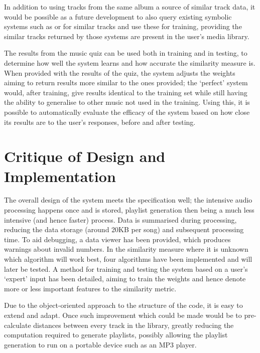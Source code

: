 In addition to using tracks from the same album a source of similar track data, it would be possible as a future development to also query existing symbolic systems such as  or  for similar tracks and use these for training, providing the similar tracks returned by those systems are present in the user's media library.

The results from the music quiz can be used both in training and in testing, to determine how well the system learns and how accurate the similarity measure is. When provided with the results of the quiz, the system adjusts the weights aiming to return results more similar to the ones provided; the `perfect' system would, after training, give results identical to the training set while still having the ability to generalise to other music not used in the training. Using this, it is possible to automatically evaluate the efficacy of the system based on how close its results are to the user's responses, before and after testing.
\section{Critique of Design and Implementation}
The overall design of the system meets the specification well; the intensive audio processing happens once and is stored, playlist generation then being a much less intensive (and hence faster) process. Data is summarised during processing, reducing the data storage (around 20KB per song) and subsequent processing time. To aid debugging, a data viewer has been provided, which produces warnings about invalid numbers. In the similarity measure where it is unknown which algorithm will work best, four algorithms have been implemented and will later be tested. A method for training and testing the system based on a user's `expert' input has been detailed, aiming to train the weights and hence denote more or less important features to the similarity metric.

Due to the object-oriented approach to the structure of the code, it is easy to extend and adapt. Once such improvement which could be made would be to pre-calculate distances between every track in the library, greatly reducing the computation required to generate playlists, possibly allowing the playlist generation to run on a portable device such as an MP3 player.
